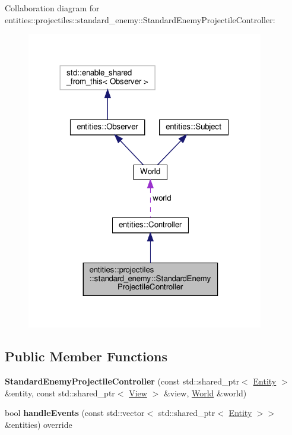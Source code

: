 Collaboration diagram for entities\+:\+:projectiles\+:\+:standard\+\_\+enemy\+:\+:Standard\+Enemy\+Projectile\+Controller\+:\nopagebreak
\begin{figure}[H]
\begin{center}
\leavevmode
\includegraphics[width=293pt]{classentities_1_1projectiles_1_1standard__enemy_1_1StandardEnemyProjectileController__coll__graph}
\end{center}
\end{figure}
\subsection*{Public Member Functions}
\begin{DoxyCompactItemize}
\item 
\mbox{\label{classentities_1_1projectiles_1_1standard__enemy_1_1StandardEnemyProjectileController_a606a41a83cf137d079d02a1082b3d4e7}} 
{\bfseries Standard\+Enemy\+Projectile\+Controller} (const std\+::shared\+\_\+ptr$<$ \hyperlink{classentities_1_1Entity}{Entity} $>$ \&entity, const std\+::shared\+\_\+ptr$<$ \hyperlink{classentities_1_1View}{View} $>$ \&view, \hyperlink{classWorld}{World} \&world)
\item 
\mbox{\label{classentities_1_1projectiles_1_1standard__enemy_1_1StandardEnemyProjectileController_ab462caef5dfc423f8f6fcdb195d59676}} 
bool {\bfseries handle\+Events} (const std\+::vector$<$ std\+::shared\+\_\+ptr$<$ \hyperlink{classentities_1_1Entity}{Entity} $>$$>$ \&entities) override
\end{DoxyCompactItemize}

